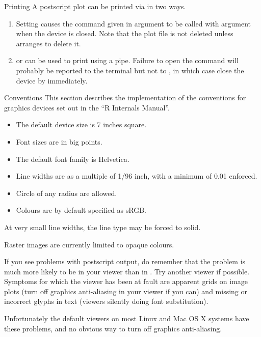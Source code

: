 %
\begin{Section}{Printing}
A postscript plot can be printed via  in two ways.
\begin{enumerate}

\item Setting  causes the command given in
argument  to be called with argument 
when the device is closed.  Note that the plot file is not deleted
unless  arranges to delete it.

\item {} or  can be used to print
using a pipe.  Failure to open the command will probably be reported
to the terminal but not to \R{}, in which case close the
device by  immediately.

\end{enumerate}

\end{Section}
%
\begin{Section}{Conventions}
This section describes the implementation of the conventions for
graphics devices set out in the ``R Internals Manual''.

\begin{itemize}

\item The default device size is 7 inches square.
\item Font sizes are in big points.
\item The default font family is Helvetica.
\item Line widths are as a multiple of 1/96 inch, with a minimum
of 0.01 enforced.   
\item Circle of any radius are allowed.
\item Colours are by default specified as sRGB.

\end{itemize}


At very small line widths, the line type may be forced to solid.

Raster images are currently limited to opaque colours.
\end{Section}
%
\begin{Note}\relax
If you see problems with postscript output, do remember that the
problem is much more likely to be in your viewer than in \R{}.  Try
another viewer if possible.  Symptoms for which the viewer has been at
fault are apparent grids on image plots (turn off graphics
anti-aliasing in your viewer if you can) and missing or incorrect glyphs
in text (viewers silently doing font substitution).

Unfortunately the default viewers on most Linux and Mac OS X systems
have these problems, and no obvious way to turn off graphics anti-aliasing.
\end{Note}
